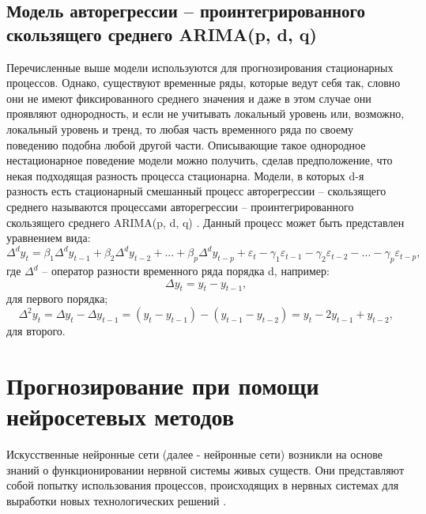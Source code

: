 \documentclass[a4paper,14pt,russian]{extreport}
\begin{document}
 \subsection{Модель авторегрессии -- проинтегрированного скользящего среднего 
 ARIMA(p, d, q)}
 Перечисленные выше модели используются для прогнозирования стационарных 
 процессов. Однако, существуют временные ряды, которые  ведут 
 себя так, словно они не имеют фиксированного среднего значения и даже в 
 этом случае они проявляют однородность, и если не учитывать локальный 
 уровень или, возможно, локальный уровень и тренд, то любая часть временного 
 ряда по своему поведению подобна любой другой части. Описывающие такое 
 однородное нестационарное поведение модели можно получить, сделав 
 предположение, что некая подходящая разность процесса стационарна. 
 Модели, в которых d-я разность есть стационарный смешанный процесс 
 авторегрессии -- скользящего среднего называются процессами авторегрессии 
 -- проинтегрированного скользящего среднего ARIMA(p, d, q) \cite{box2008}. 
 Данный процесс может быть представлен уравнением вида:
 \begin{equation}
	\Delta^d y_t = \beta_1 \Delta^d y_{t-1} + \beta_2 \Delta^d y_{t-2} + ... 
		+ \beta_p \Delta^d y_{t-p} + \varepsilon_t  - \gamma_1 \varepsilon_{t-1} 
		- \gamma_2 \varepsilon_{t-2} - ... - \gamma_p \varepsilon_{t-p}, 
\end{equation}
где $\Delta^d$ --  оператор разности временного ряда порядка d, например: 
\begin{equation}
	\Delta y_t = y_t - y_{t - 1} \text{,} \nonumber
\end{equation}
для первого порядка;
\begin{equation}
	\Delta^2 y_t = \Delta y_t - \Delta y_{t - 1} = (y_t - y_{t - 1}) - (y_{t - 1} - y_{t - 2}) 
		= y_t - 2y_{t - 1} + y_{t - 2} \text{,} \nonumber
\end{equation}
для второго.

\section{Прогнозирование при помощи нейросетевых методов}
Искусственные нейронные сети (далее - нейронные сети) возникли на основе 
знаний о функционировании нервной системы живых существ. Они 
представляют собой попытку использования процессов, происходящих в 
нервных системах для выработки новых технологических решений 
\cite{osovskiy2002}. 
\end{document}
